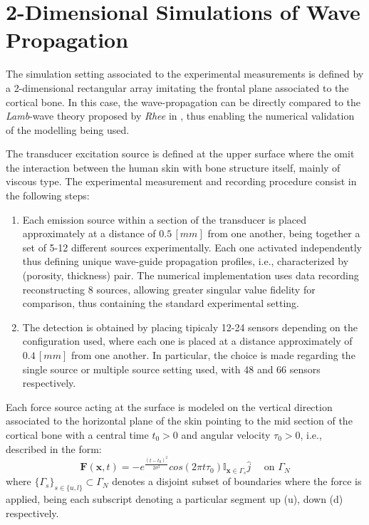 \section{2-Dimensional Simulations of Wave Propagation}
The simulation setting associated to the experimental measurements is defined by a 2-dimensional rectangular array imitating the frontal plane associated to the cortical bone. In this case, the wave-propagation can be directly compared to the \textit{Lamb}-wave  theory proposed by \textit{Rhee} in \cite{Rhee2007}, thus enabling the numerical validation of the modelling being used. 

The transducer excitation source is defined at the upper surface where the omit the interaction between the human skin with bone structure itself, mainly of viscous type.
The experimental measurement and recording procedure consist in the following steps:
\begin{enumerate}
    \item Each emission source within a section of the transducer is placed approximately at a distance of $0.5 \, [mm]$ from one another, being together a set of 5-12 different sources experimentally. Each one activated independently thus defining unique wave-guide propagation profiles, i.e., characterized by (porosity, thickness) pair. The numerical implementation uses data recording reconstructing 8 sources, allowing greater singular value fidelity for comparison, thus containing the standard experimental setting.
    
    \item The detection is obtained by placing tipicaly 12-24 sensors depending on the configuration used, where each one is placed at a distance approximately of $0.4 \, [mm]$ from one another. In particular, the choice is made regarding the single source or multiple source setting used, with 48 and 66 sensors respectively.
\end{enumerate}
Each force source acting at the surface is modeled on the vertical direction associated to the horizontal plane of the skin pointing to the mid section of the cortical bone with a central time $t_0 > 0$ and angular velocity $\tau_0 > 0$, i.e., described in the form:
\begin{equation}
    \label{Force-eq}
    \mathbf{F}(\mathbf{x},t) = - e^{\frac{(t-t_0)^2}{2\sigma^2}} cos( 2 \pi t \tau_0 ) \mathbb{I}_{\mathbf{x} \in \Gamma_{s}} \hat{j} \quad \text{ on } \Gamma_N
\end{equation}
where $\{ \Gamma_s\}_{s \in \{u,l\}} \subset \Gamma_N$ denotes a disjoint subset of boundaries where the force is applied, being each subscript denoting a particular segment up (u), down (d) respectively.  

